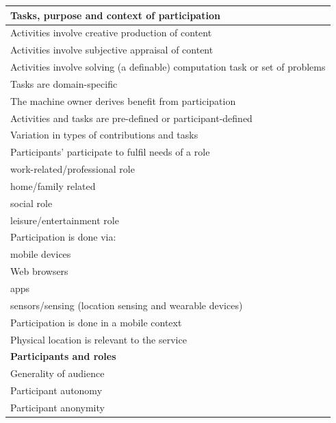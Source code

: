 \documentclass{www13-companion-accepted}
\begin{document}
\begin{table}[htb]
\begin{center}
\begin{scriptsize}
\begin{tabular}{|p{8cm}|}
\hline
{\bf Tasks, purpose and context of participation} \\
\hline
Activities involve creative production of content \\
Activities involve subjective appraisal of content \\
Activities involve solving (a definable) computation task or set of problems\\
Tasks are domain-specific \\
The machine owner derives benefit from participation \\
Activities and tasks are pre-defined or participant-defined \\
Variation in types of contributions and tasks \\
Participants' participate to fulfil needs of a role \\
\hspace{1cm} work-related/professional role \\
\hspace{1cm} home/family related \\
\hspace{1cm} social role \\
\hspace{1cm} leisure/entertainment role \\
Participation is done via: \\
\hspace{1cm} mobile devices \\
\hspace{1cm} Web browsers \\
\hspace{1cm} apps \\
\hspace{1cm} sensors/sensing (location sensing and wearable devices) \\
Participation is done in a mobile context \\
\hspace{1cm} Physical location is relevant to the service \\
\hline
{\bf Participants and roles} \\
\hline
Generality of audience \\
Participant autonomy \\
Participant anonymity \\

\end{tabular}
\end{scriptsize}
\end{center}
\end{table}
\end{document}
